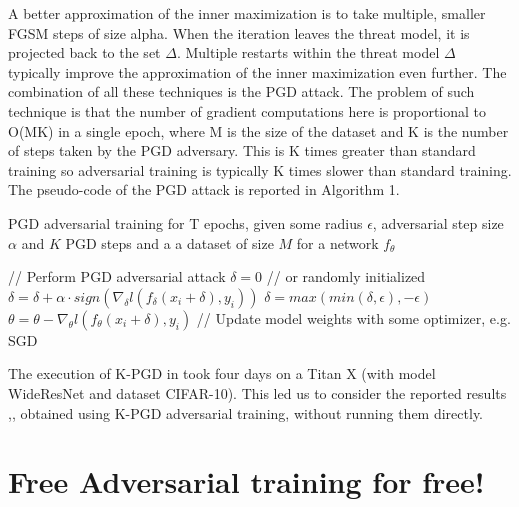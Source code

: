 \documentclass{article}
\begin{document}
A better approximation of the inner maximization is to take multiple, smaller
FGSM steps of size alpha. When the iteration leaves the threat model, it is
projected back to the set $\Delta$. Multiple restarts within the threat model
$\Delta$ typically improve the approximation of the inner maximization even
further. The combination of all these techniques is the PGD attack. The problem
of such technique is that the number of gradient computations here is
proportional to O(MK) in a single epoch, where M is the size of the dataset and
K is the number of steps taken by the PGD adversary. This is K times greater
than standard training so adversarial training is typically K times slower than
standard training. The pseudo-code of the PGD attack is reported in Algorithm 1.
\begin{algorithm}[H]
	\caption{PGD adversarial training for T epochs, given some radius $\epsilon$,
	adversarial step size $\alpha$ and $K$ PGD steps and a a dataset of size $M$
	for a network $f_{\theta}$}
	\begin{algorithmic}[1]
		  \State// Perform PGD adversarial attack
		\State $\delta = 0$ // or randomly initialized  \State
		$\delta = \delta + \alpha\cdot sign(\nabla_{\delta}l(f_{\delta}(x_i +
		\delta), y_i))$ \State $\delta = max(min(\delta, \epsilon), -\epsilon)$
		\EndFor \State$\theta = \theta - \nabla_{\theta}l(f_{\theta}(x_i + \delta),
		y_i)$ // Update model weights with some optimizer, e.g. SGD \EndFor \EndFor
	\end{algorithmic}
\end{algorithm}
The execution of K-PGD in \cite{MadryEtAl2017} took four days on a Titan X (with
model WideResNet and dataset CIFAR-10). This led us to consider the reported
results \cite{ShafahiEtAl2019b},\cite{WongEtAl2020}, obtained using K-PGD
adversarial training, without running them directly.

\section{Free Adversarial training for free!}
\end{document}
